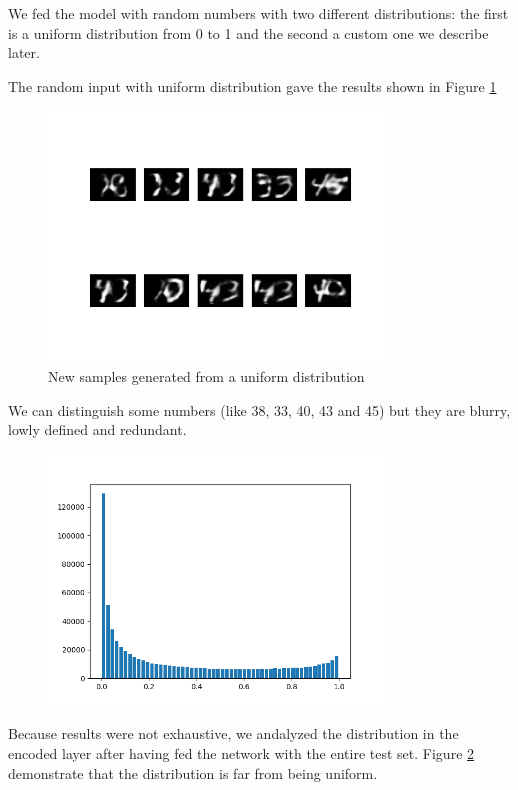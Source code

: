 \documentclass[compsoc]{IEEEtran}
\begin{document}
We fed the model with random numbers with two different distributions: the first is a uniform distribution from 0 to 1 and the second a custom one we describe later.\par
The random input with uniform distribution gave the results shown in Figure \ref{fig:unif}

\begin{figure}[ht!]
\centering                                                                        
\includegraphics[width=3.5in]{unif.png}
\captionsetup{justification=centering}
\caption{New samples generated from a uniform distribution}
\label{fig:unif}
\end{figure}

We can distinguish some numbers (like 38, 33, 40, 43 and 45) but they are blurry, lowly defined and redundant.

\begin{figure}[ht!]
\centering                                                                        
\includegraphics[width=3.5in]{enco.png}
\captionsetup{justification=centering}
\caption{}
\label{fig:enco}
\end{figure}

Because results were not exhaustive, we andalyzed the distribution in the encoded layer after having fed the network with the entire
test set. Figure \ref{fig:enco} demonstrate that the distribution is far from being uniform.
\end{document}
